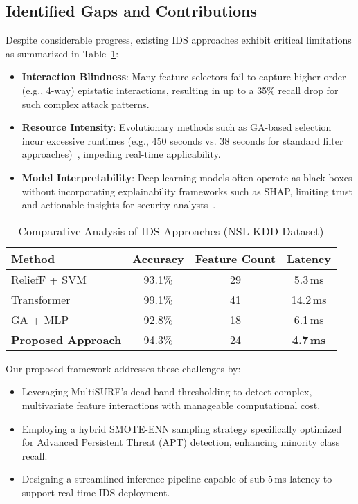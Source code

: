 \documentclass[conference]{IEEEtran}
\begin{document}
\subsection{Identified Gaps and Contributions}
Despite considerable progress, existing IDS approaches exhibit critical limitations as summarized in Table~\ref{tab:comparison}:

\begin{itemize}
\item \textbf{Interaction Blindness}: Many feature selectors fail to capture higher-order (e.g., 4-way) epistatic interactions, resulting in up to a 35\% recall drop for such complex attack patterns.
\item \textbf{Resource Intensity}: Evolutionary methods such as GA-based selection incur excessive runtimes (e.g., 450 seconds vs. 38 seconds for standard filter approaches)~\cite{ga2024}, impeding real-time applicability.
\item \textbf{Model Interpretability}: Deep learning models often operate as black boxes without incorporating explainability frameworks such as SHAP, limiting trust and actionable insights for security analysts~\cite{shap2024}.
\end{itemize}

\begin{table}[htbp]
\caption{Comparative Analysis of IDS Approaches (NSL-KDD Dataset)}
\label{tab:comparison}
\centering
\begin{tabular}{lccc}
\hline
\textbf{Method} & \textbf{Accuracy} & \textbf{Feature Count} & \textbf{Latency} \\
\hline
ReliefF + SVM~\cite{relieff2023} & 93.1\% & 29 & 5.3\,ms \\
Transformer~\cite{zhang} & 99.1\% & 41 & 14.2\,ms \\
GA + MLP~\cite{ga2024} & 92.8\% & 18 & 6.1\,ms \\
\textbf{Proposed Approach} & 94.3\% & 24 & \textbf{4.7\,ms} \\
\hline
\end{tabular}
\end{table}

Our proposed framework addresses these challenges by:

\begin{itemize}
\item Leveraging MultiSURF’s dead-band thresholding to detect complex, multivariate feature interactions with manageable computational cost.
\item Employing a hybrid SMOTE-ENN sampling strategy specifically optimized for Advanced Persistent Threat (APT) detection, enhancing minority class recall.
\item Designing a streamlined inference pipeline capable of sub-5\,ms latency to support real-time IDS deployment.
\end{itemize}
\end{document}
